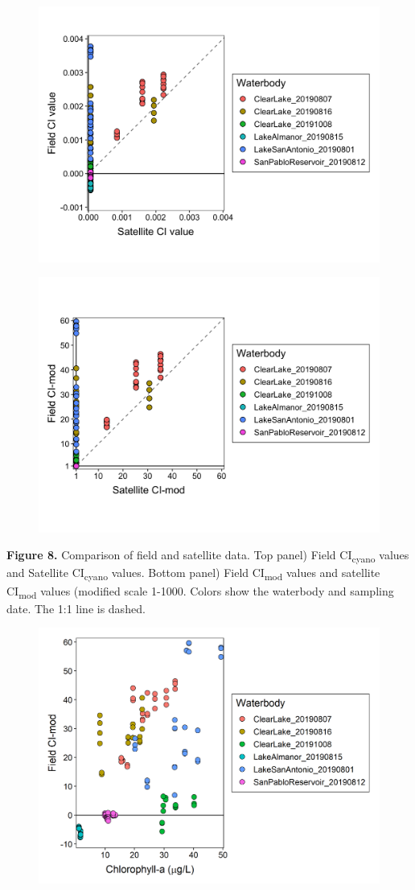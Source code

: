 \documentclass[
]{article}
\begin{document}
\begin{figure}
\includegraphics[width=0.5\linewidth]{../Data/Figures_output/ci_fs} \end{figure}
\begin{figure}
\includegraphics[width=0.5\linewidth]{../Data/Figures_output/ci_mod_fs} \end{figure}

\textbf{Figure 8.} Comparison of field and satellite data. Top panel)
Field CI\textsubscript{cyano} values and Satellite
CI\textsubscript{cyano} values. Bottom panel) Field
CI\textsubscript{mod} values and satellite CI\textsubscript{mod} values
(modified scale 1-1000. Colors show the waterbody and sampling date. The
1:1 line is dashed.

\begin{figure}

{\centering \includegraphics[width=0.6\linewidth]{../Data/Figures_output/ci_mod_chla} 

}

\end{figure}
\end{document}
